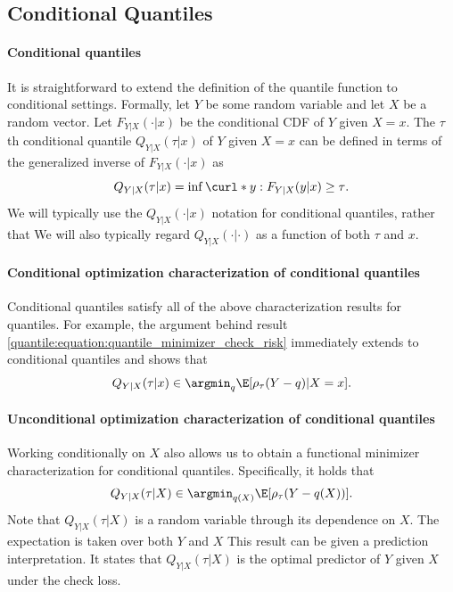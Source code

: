  \subsection{Conditional Quantiles}

\paragraph{Conditional quantiles}


It is straightforward to extend the definition of the quantile function to conditional settings.  Formally, let $Y$ be some random variable and let $X$ be a random vector. Let $F_{Y|X}(\cdot|x)$ be the conditional CDF of $Y$ given $X=x$. 
%
The $\tau$th conditional quantile $Q_{Y|X}(\tau|x)$ of $Y$ given $X=x$ can  be defined in terms of the generalized inverse of $F_{Y|X}(\cdot|x)$ as
\begin{equation}
	 Q_{Y|X}(\tau|x) =  \inf\curl*{ y: F_{Y|X}(y|x)\geq \tau }.
\end{equation}
We will typically use the $Q_{Y|X}(\cdot|x)$ notation for conditional quantiles, rather that    We will also typically regard $Q_{Y|X}(\cdot|\cdot)$ as a function of both $\tau$ and $x$. 


\paragraph{Conditional optimization characterization of  conditional quantiles}

Conditional quantiles satisfy all of the above characterization results for quantiles.
%
For example, the argument behind result \eqref{quantile:equation:quantile_minimizer_check_risk} immediately extends to conditional quantiles and shows that 
\begin{equation}\label{quantile:equation:conditional_quantile_conditional_minimizer}
	 Q_{Y|X}(\tau|x) \in \argmin_q  \E[\rho_{\tau}(Y-q)|X=x].
\end{equation}

\paragraph{Unconditional optimization characterization of conditional quantiles}

Working conditionally on $X$ also allows us to obtain a functional minimizer characterization for conditional quantiles. Specifically, it holds that
\begin{equation} \label{quantile:equation:conditional_quantile_unconditional_minimizer}
		 Q_{Y|X}(\tau|X) \in \argmin_{q(X)}  \E[\rho_{\tau}(Y-q(X))].
\end{equation}
Note that $Q_{Y|X}(\tau|X)$ is a random variable through its dependence on $X$. The expectation is taken over both $Y$ and $X$ 
%
This result can be given a prediction interpretation.  It states that  $Q_{Y|X}(\tau|X)$ is the optimal predictor of $Y$ given $X$ under the check loss. 

